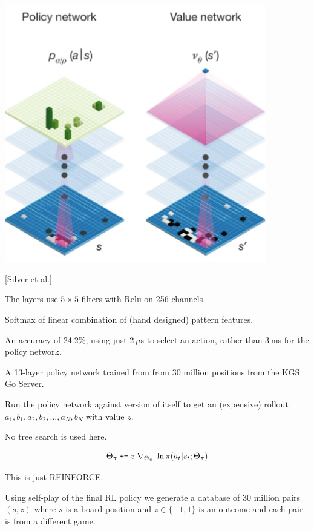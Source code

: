 {\centerline{\includegraphics[width=4.5in]{../images/alphagoArchitecture2}}

\centerline{[Silver et al.]}

\centerline{The layers use $5\times 5$ filters with Relu on 256 channels}


Softmax of linear combination of (hand designed) pattern features.

\vfill
An accuracy of 24.2\%, using just 2 $\mu$s to select an action, rather than 3 ms for the policy network.


A 13-layer policy network trained from from 30 million positions from the KGS Go Server.


Run the policy network against version of itself to get an (expensive) rollout $a_1,b_1,a_2,b_2,\ldots,a_N,b_N$ with value $z$.

\vfill
No tree search is used here.

$$\Theta_\pi \;\mbox{\tt +=}\; z\; \nabla_{\Theta_\pi} \;\ln \pi(a_t|s_t;\Theta_\pi)$$

\vfill
This is just REINFORCE.


Using self-play of the final RL policy we generate a database of 30 million pairs $(s,z)$ where $s$ is a board position and $z \in \{-1,1\}$ is an outcome
and each pair is from a different game.

}
